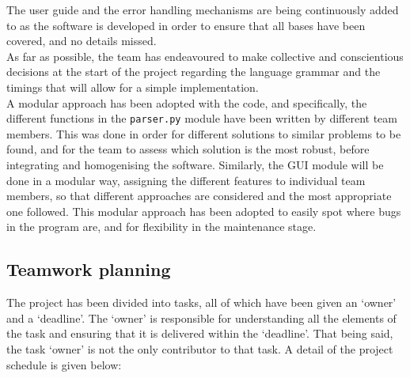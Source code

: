 \documentclass[12pt]{article}
\begin{document}
The user guide and the error handling mechanisms are being continuously added to as the software is developed in order to ensure that all bases have been covered, and no details missed.\\

As far as possible, the team has endeavoured to make collective and conscientious decisions at the start of the project regarding the language grammar and the timings that will allow for a simple implementation. \\

A modular approach has been adopted with the code, and specifically, the different functions in the \texttt{parser.py} module have been written by different team members. This was done in order for different solutions to similar problems to be found, and for the team to assess which solution is the most robust, before integrating and homogenising the software. Similarly, the GUI module will be done in a modular way, assigning the different features to individual team members, so that different approaches are considered and the most appropriate one followed. This modular approach has been adopted to easily spot where bugs in the program are, and for flexibility in the maintenance stage. 

\subsection{Teamwork planning}
The project has been divided into tasks, all of which have been given an `owner' and a `deadline'. The `owner' is responsible for understanding all the elements of the task and ensuring that it is delivered within the `deadline'. That being said, the task `owner' is not the only contributor to that task. A detail of the project schedule is given below: 
\end{document}
